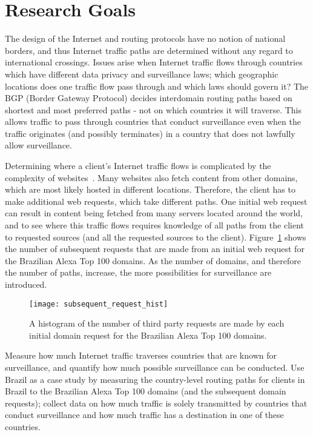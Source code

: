 \section{Research Goals}
\label{problem}

The design of the Internet and routing protocols have no notion of national borders, and thus Internet traffic paths are determined without any regard to international crossings.  Issues arise when Internet traffic flows through countries which have different data privacy and surveillance laws; which geographic locations does one traffic flow pass through and which laws should govern it?  The BGP (Border Gateway Protocol) decides interdomain routing paths based on shortest and most preferred paths - not on which countries it will traverse.  This allows traffic to pass through countries that conduct surveillance even when the traffic originates (and possibly terminates) in a country that does not lawfully allow surveillance.  

Determining where a client's Internet traffic flows is complicated by the complexity of websites~\cite{butkiewicz2011understanding}.  Many websites also fetch content from other domains, which are most likely hosted in different locations.  Therefore, the client has to make additional web requests, which take different paths.  One initial web request can result in content being fetched from many servers located around the world, and to see where this traffic flows requires knowledge of all paths from the client to requested sources (and all the requested sources to the client).  Figure~\ref{fig:domains} shows the number of subsequent requests that are made from an initial web request for the Brazilian Alexa Top 100 domains.  As the number of domains, and therefore the number of paths, increase, the more possibilities for surveillance are introduced.

\begin{figure}
\centering
\texttt{[image: subsequent\_request\_hist]}
\caption{A histogram of the number of third party requests are made by each initial domain request for the Brazilian Alexa Top 100 domains.}
\label{fig:domains}
\end{figure}

\begin{thm}
Measure how much Internet traffic traverses countries that are known for surveillance, and quantify how much possible surveillance can be conducted.  Use Brazil as a case study by measuring the country-level routing paths for clients in Brazil to the Brazilian Alexa Top 100 domains (and the subsequent domain requests); collect data on how much traffic is solely transmitted by countries that conduct surveillance and how much traffic has a destination in one of these countries.
\end{thm}

